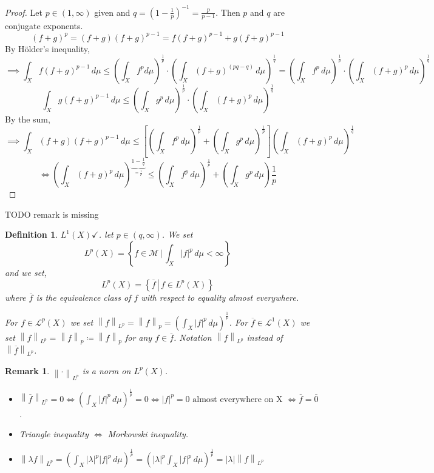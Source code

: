 \documentclass{article}
\newtheorem{definition}{Definition}  \numberwithin{definition}{section}
\newtheorem{remark}{Remark}  \numberwithin{remark}{section}
\newcommand{\setdef}[2]{\left\{\left.#1\,\right|\,#2\right\}}
\newcommand{\norm}[1]{\left\|#1\right\|}
\newcommand{\card}[1]{\left|#1\right|}
\begin{document}
\begin{proof}
  Let $p \in (1, \infty)$ given and $q = (1 - \frac1p)^{-1} = \frac{p}{p-1}$. Then $p$ and $q$ are conjugate exponents.
  \[ (f + g)^p = (f + g)(f + g)^{p-1} = f(f+ g)^{p-1} + g(f + g)^{p-1} \]
  By H\"older's inequality,
  \[ \implies \int_X f(f+g)^{p-1} \, d\mu \leq \left(\int_X f^p d\mu\right)^{\frac1p} \cdot \left(\int_X (f + g)^{(pq - q)} \, d\mu\right)^{\frac1q} = \left(\int_X f^p \, d\mu\right)^{\frac1p} \cdot \left(\int_X (f + g)^p \, d\mu\right)^{\frac1q} \]
  \[ \int_X g(f + g)^{p-1} \, d\mu \leq \left(\int_X g^p \, d\mu\right)^{\frac1p} \cdot \left(\int_X (f + g)^p \, d\mu\right)^{\frac1q} \]
  By the sum,
  \[
    \implies \int_X (f + g) (f + g)^{p-1} \, d\mu
    \leq \left[\left(\int_X f^p \, d\mu\right)^{\frac1p} + \left(\int_X g^p \, d\mu\right)^{\frac1p}\right] \left(\int_X (f + g)^p \, d\mu\right)^{\frac1q}
  \]
  \[ \iff \left(\int_X (f + g)^p \, d\mu\right)^{\underbrace{1 - \frac1q}_{=\frac1p}} \leq \left(\int_X f^p \, d\mu\right)^{\frac1p} + \left(\int_X g^p \, d\mu\right) \frac1p \]
\end{proof}

TODO remark is missing

\begin{definition}
  $L^1(X) \checkmark$. let $p \in (q, \infty)$. We set
  \[ L^p(X) = \setdef{f \in \mathcal M}{\int_X \card{f}^p \, d\mu < \infty} \]
  and we set,
  \[ L^p(X) = \setdef{\overline{f}}{f \in L^p(X)} \]
  where $\overline{f}$ is the equivalence class of $f$ with respect to equality almost everywhere.

  For $f \in \mathcal L^p(X)$ we set $\norm{f}_{L^p} = \norm{f}_p = \left(\int_X \card{f}^p \, d\mu\right)^{\frac1p}$.
  For $\overline{f} \in \mathcal L^1(X)$ we set $\norm{f}_{L^p} = \norm{f}_p \coloneqq \norm{f}_p$ for any $f \in \overline{f}$.
  Notation $\norm{f}_{L^p}$ instead of $\norm{\overline{f}}_{L^p}$.
\end{definition}

\begin{remark}
  $\norm{\cdot}_{L^p}$ is a norm on $L^p(X)$.
  \begin{itemize}
    \item $\norm{\overline{f}}_{L^p} = 0 \iff \left(\int_X \card{f}^p \, d\mu\right)^{\frac1p} = 0 \iff \card{f}^p = 0 \text{ almost everywhere on X } \iff \overline{f} = \overline{0}$.
    \item Triangle inequality $\iff$ Morkowski inequality.
    \item $\norm{\lambda f}_{L^p} = \left(\int_X \card{\lambda}^p \card{f}^p \, d\mu\right)^{\frac1p} = \left(\card{\lambda}^p \int_X \card{f}^p \, d\mu\right)^{\frac1p} = \card{\lambda} \norm{f}_{L^p}$
  \end{itemize}
\end{remark}
\end{document}
